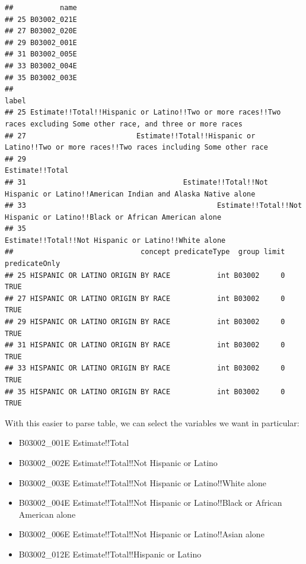 \documentclass[
  openany]{book}
\providecommand{\tightlist}{%
  \setlength{\itemsep}{0pt}\setlength{\parskip}{0pt}}
\begin{document}
\begin{verbatim}
##           name
## 25 B03002_021E
## 27 B03002_020E
## 29 B03002_001E
## 31 B03002_005E
## 33 B03002_004E
## 35 B03002_003E
##                                                                                                                   label
## 25 Estimate!!Total!!Hispanic or Latino!!Two or more races!!Two races excluding Some other race, and three or more races
## 27                          Estimate!!Total!!Hispanic or Latino!!Two or more races!!Two races including Some other race
## 29                                                                                                      Estimate!!Total
## 31                                     Estimate!!Total!!Not Hispanic or Latino!!American Indian and Alaska Native alone
## 33                                             Estimate!!Total!!Not Hispanic or Latino!!Black or African American alone
## 35                                                                 Estimate!!Total!!Not Hispanic or Latino!!White alone
##                              concept predicateType  group limit predicateOnly
## 25 HISPANIC OR LATINO ORIGIN BY RACE           int B03002     0          TRUE
## 27 HISPANIC OR LATINO ORIGIN BY RACE           int B03002     0          TRUE
## 29 HISPANIC OR LATINO ORIGIN BY RACE           int B03002     0          TRUE
## 31 HISPANIC OR LATINO ORIGIN BY RACE           int B03002     0          TRUE
## 33 HISPANIC OR LATINO ORIGIN BY RACE           int B03002     0          TRUE
## 35 HISPANIC OR LATINO ORIGIN BY RACE           int B03002     0          TRUE
\end{verbatim}

With this easier to parse table, we can select the variables we want in particular:

\begin{itemize}
\tightlist
\item
  B03002\_001E Estimate!!Total\\
\item
  B03002\_002E Estimate!!Total!!Not Hispanic or Latino
\item
  B03002\_003E Estimate!!Total!!Not Hispanic or Latino!!White alone
\item
  B03002\_004E Estimate!!Total!!Not Hispanic or Latino!!Black or African American alone
\item
  B03002\_006E Estimate!!Total!!Not Hispanic or Latino!!Asian alone
\item
  B03002\_012E Estimate!!Total!!Hispanic or Latino
\end{itemize}
\end{document}
